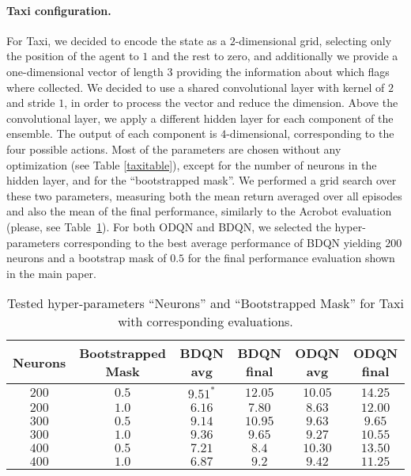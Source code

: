 \paragraph{Taxi configuration.} For Taxi, we decided to encode the state as a $2$-dimensional grid, selecting only the position of the agent to $1$ and the rest to zero, and additionally we provide a one-dimensional vector of length $3$ providing the information about which flags where collected. We decided to use a shared convolutional layer with kernel of $2$ and stride $1$, in order to process the vector and reduce the dimension. Above the convolutional layer, we apply a different hidden layer for each component of the ensemble. The output of each component is $4$-dimensional, corresponding to the four possible actions. Most of the parameters are chosen without any optimization (see Table \ref{taxitable}), except for the number of neurons in the hidden layer, and for the ``bootstrapped mask''.
We performed a grid search over these two parameters, measuring both the mean return averaged over all
episodes and also the mean of the final performance, similarly to the Acrobot evaluation (please, see
Table~\ref{taxigrid}). For both ODQN and BDQN, we selected the hyper-parameters corresponding to the
best average performance of BDQN yielding $200$ neurons and a bootstrap mask of $0.5$ for the final performance evaluation shown in the main paper.
\begin{table}[h]
	\begin{tabular}{ c c | c c | c c  }
		\textbf{Neurons} & \textbf{Bootstrapped Mask} & \textbf{BDQN} avg & \textbf{BDQN} final & \textbf{ODQN} avg & \textbf{ODQN} final  \\ 
		\hline
		$200$ & $0.5$ & $9.51^*$ & $12.05$ & $\mathbf{10.05}$ & $\mathbf{14.25}$ \\
		$200$ & $1.0$ & $6.16$ & $7.80$ & $\mathbf{8.63}$ & $\mathbf{12.00}$ \\
		$300$ & $0.5$ & $9.14$ & $\mathbf{10.95}$ & $\mathbf{9.63}$ & $9.65$ \\
		$300$ & $1.0$ & $\mathbf{9.36}$ & $9.65$ & $9.27$ & $\mathbf{10.55}$ \\
		$400$ & $0.5$ & $7.21$ & $8.4$ & $\mathbf{10.30}$ & $\mathbf{13.50}$ \\
		$400$ & $1.0$ & $6.87$ & $9.2$ & $\mathbf{9.42}$ & $\mathbf{11.25}$ 
	\end{tabular}
	\caption{Tested hyper-parameters ``Neurons'' and ``Bootstrapped Mask'' for Taxi with corresponding evaluations.\label{taxigrid}}
\end{table}

